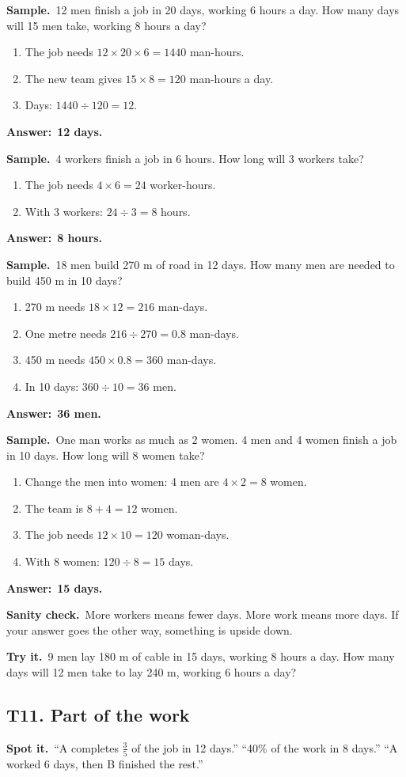 \documentclass[11pt,a4paper]{article}
\let\oldsubsection\subsection
\renewcommand{\subsection}{\needspace{9\baselineskip}\oldsubsection}
\newcommand{\spot}{\textbf{\color{ember}Spot it.}\ }
\newif\ifkeepsamp
\newcommand{\ans}[1]{\par\nopagebreak\noindent\textbf{\color{ember}Answer:}\ \textbf{#1}\par}
\newcommand{\samp}{\ifkeepsamp\needspace{4\baselineskip}\fi\textbf{\color{ember}Sample.}\ }
\newcommand{\sane}{\textbf{\color{slate}Sanity check.}\ }
\newcommand{\tryit}[1]{\textbf{\color{ember}Try it.}\ #1}
\begin{document}
\samp 12 men finish a job in 20 days, working 6 hours a day. How many days will 15 men take, working 8 hours a day?
\begin{enumerate}
\item The job needs $12 \times 20 \times 6 = 1440$ man-hours.
\item The new team gives $15 \times 8 = 120$ man-hours a day.
\item Days: $1440 \div 120 = 12$.
\end{enumerate}
\ans{12 days.}

\samp 4 workers finish a job in 6 hours. How long will 3 workers take?
\begin{enumerate}
\item The job needs $4 \times 6 = 24$ worker-hours.
\item With 3 workers: $24 \div 3 = 8$ hours.
\end{enumerate}
\ans{8 hours.}

\samp 18 men build 270 m of road in 12 days. How many men are needed to build 450 m in 10 days?
\begin{enumerate}
\item 270 m needs $18 \times 12 = 216$ man-days.
\item One metre needs $216 \div 270 = 0.8$ man-days.
\item 450 m needs $450 \times 0.8 = 360$ man-days.
\item In 10 days: $360 \div 10 = 36$ men.
\end{enumerate}
\ans{36 men.}

\samp One man works as much as 2 women. 4 men and 4 women finish a job in 10 days. How long will 8 women take?
\begin{enumerate}
\item Change the men into women: 4 men are $4 \times 2 = 8$ women.
\item The team is $8 + 4 = 12$ women.
\item The job needs $12 \times 10 = 120$ woman-days.
\item With 8 women: $120 \div 8 = 15$ days.
\end{enumerate}
\ans{15 days.}

\sane More workers means fewer days. More work means more days. If your answer goes the other way, something is upside down.

\tryit 9 men lay 180 m of cable in 15 days, working 8 hours a day. How many days will 12 men take to lay 240 m, working 6 hours a day?

\subsection{T11. Part of the work}
\spot ``A completes $\tfrac35$ of the job in 12 days.'' ``40\% of the work in 8 days.'' ``A worked 6 days, then B finished the rest.''
\end{document}
